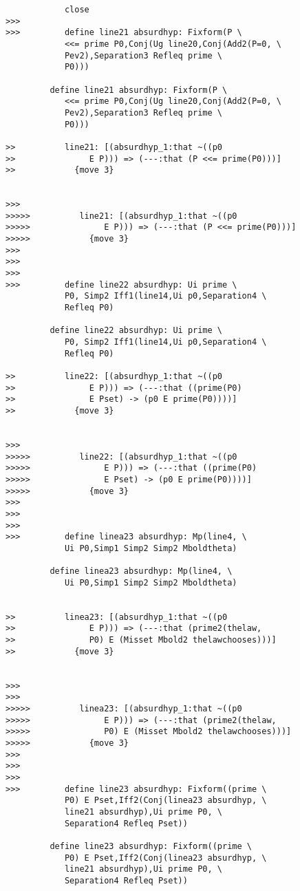 \documentclass[12pt]{article}
\begin{document}
\begin{verbatim}
            close
>>>
>>>         define line21 absurdhyp: Fixform(P \
            <<= prime P0,Conj(Ug line20,Conj(Add2(P=0, \
            Pev2),Separation3 Refleq prime \
            P0)))

         define line21 absurdhyp: Fixform(P \
            <<= prime P0,Conj(Ug line20,Conj(Add2(P=0, \
            Pev2),Separation3 Refleq prime \
            P0)))

>>          line21: [(absurdhyp_1:that ~((p0
>>               E P))) => (---:that (P <<= prime(P0)))]
>>            {move 3}


>>>
>>>>>          line21: [(absurdhyp_1:that ~((p0
>>>>>               E P))) => (---:that (P <<= prime(P0)))]
>>>>>            {move 3}
>>>
>>>
>>>
>>>         define line22 absurdhyp: Ui prime \
            P0, Simp2 Iff1(line14,Ui p0,Separation4 \
            Refleq P0)

         define line22 absurdhyp: Ui prime \
            P0, Simp2 Iff1(line14,Ui p0,Separation4 \
            Refleq P0)

>>          line22: [(absurdhyp_1:that ~((p0
>>               E P))) => (---:that ((prime(P0)
>>               E Pset) -> (p0 E prime(P0))))]
>>            {move 3}


>>>
>>>>>          line22: [(absurdhyp_1:that ~((p0
>>>>>               E P))) => (---:that ((prime(P0)
>>>>>               E Pset) -> (p0 E prime(P0))))]
>>>>>            {move 3}
>>>
>>>
>>>
>>>         define linea23 absurdhyp: Mp(line4, \
            Ui P0,Simp1 Simp2 Simp2 Mboldtheta)

         define linea23 absurdhyp: Mp(line4, \
            Ui P0,Simp1 Simp2 Simp2 Mboldtheta)


>>          linea23: [(absurdhyp_1:that ~((p0
>>               E P))) => (---:that (prime2(thelaw,
>>               P0) E (Misset Mbold2 thelawchooses)))]
>>            {move 3}


>>>
>>>
>>>>>          linea23: [(absurdhyp_1:that ~((p0
>>>>>               E P))) => (---:that (prime2(thelaw,
>>>>>               P0) E (Misset Mbold2 thelawchooses)))]
>>>>>            {move 3}
>>>
>>>
>>>
>>>         define line23 absurdhyp: Fixform((prime \
            P0) E Pset,Iff2(Conj(linea23 absurdhyp, \
            line21 absurdhyp),Ui prime P0, \
            Separation4 Refleq Pset))

         define line23 absurdhyp: Fixform((prime \
            P0) E Pset,Iff2(Conj(linea23 absurdhyp, \
            line21 absurdhyp),Ui prime P0, \
            Separation4 Refleq Pset))


\end{verbatim}
\end{document}
